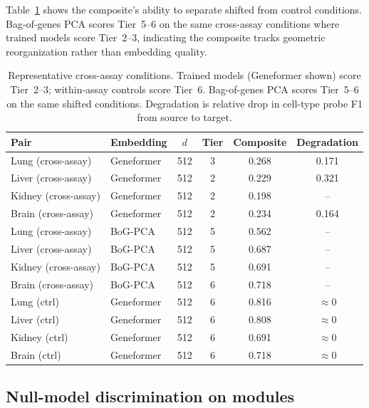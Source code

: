 \documentclass[10pt,letterpaper]{article}
\begin{document}
Table~\ref{tab:separation} shows the composite's ability to separate shifted from control conditions. Bag-of-genes PCA scores Tier~5--6 on the same cross-assay conditions where trained models score Tier~2--3, indicating the composite tracks geometric reorganization rather than embedding quality.

\begin{table}[h!]
\centering
\caption{Representative cross-assay conditions. Trained models (Geneformer shown) score Tier~2--3; within-assay controls score Tier~6. Bag-of-genes PCA scores Tier~5--6 on the same shifted conditions. Degradation is relative drop in cell-type probe F1 from source to target.}
\label{tab:separation}
\small
\begin{tabular}{@{}llcccc@{}}
\toprule
Pair & Embedding & $d$ & Tier & Composite & Degradation \\
\midrule
Lung (cross-assay) & Geneformer & 512 & 3 & 0.268 & 0.171 \\
Liver (cross-assay) & Geneformer & 512 & 2 & 0.229 & 0.321 \\
Kidney (cross-assay) & Geneformer & 512 & 2 & 0.198 & -- \\
Brain (cross-assay) & Geneformer & 512 & 2 & 0.234 & 0.164 \\
\midrule
Lung (cross-assay) & BoG-PCA & 512 & 5 & 0.562 & -- \\
Liver (cross-assay) & BoG-PCA & 512 & 5 & 0.687 & -- \\
Kidney (cross-assay) & BoG-PCA & 512 & 5 & 0.691 & -- \\
Brain (cross-assay) & BoG-PCA & 512 & 6 & 0.718 & -- \\
\midrule
Lung (ctrl) & Geneformer & 512 & 6 & 0.816 & $\approx 0$ \\
Liver (ctrl) & Geneformer & 512 & 6 & 0.808 & $\approx 0$ \\
Kidney (ctrl) & Geneformer & 512 & 6 & 0.691 & $\approx 0$ \\
Brain (ctrl) & Geneformer & 512 & 6 & 0.718 & $\approx 0$ \\
\bottomrule
\end{tabular}
\end{table}

\subsection{Null-model discrimination on modules}
\end{document}
